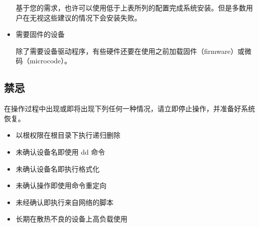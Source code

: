 \documentclass{article}
\begin{document}
\begin{multicols*}{3}
\begin{itemize}[leftmargin=*]
		基于您的需求，也许可以使用低于上表所列的配置完成系统安装。但是多数用户在无视这些建议的情况下会安装失败。

		\item 需要固件的设备

		除了需要设备驱动程序，有些硬件还要在使用之前加载固件（firmware）或微码（microcode）。

	\end{itemize}


	\begin{tcolorbox}
	\section*{禁忌}
	\end{tcolorbox}

	在操作过程中出现或即将出现下列任何一种情况，请立即停止操作，并准备好系统恢复。

	\begin{itemize}[leftmargin=*]
		\setlength{\itemsep}{0pt}
		\setlength{\parskip}{0pt}
		\setlength{\parsep}{0pt}

		\item 以根权限在根目录下执行递归删除
		\item 未确认设备名即使用 dd 命令
		\item 未确认设备名即执行格式化
		\item 未确认操作即使用命令重定向
		\item 未经确认即执行来自网络的脚本
		\item 长期在散热不良的设备上高负载使用
	\end{itemize}








\end{multicols*}
\end{document}

